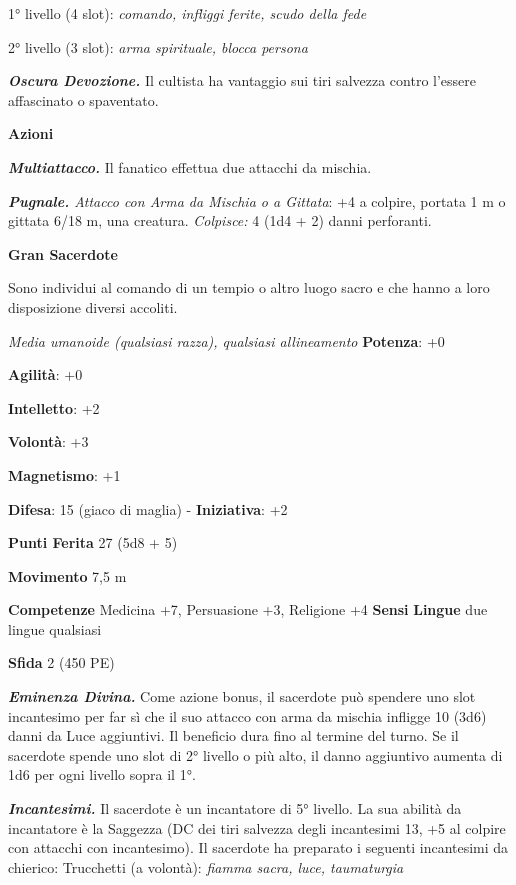 \begin{multicols}{2}
1° livello (4 slot): \emph{comando, infliggi ferite, scudo della fede}

2° livello (3 slot): \emph{arma spirituale, blocca persona}

\emph{\textbf{Oscura Devozione.}} Il cultista ha vantaggio sui tiri
salvezza contro l'essere affascinato o spaventato.

\smallskip\textbf{Azioni}

\emph{\textbf{Multiattacco.}} Il fanatico effettua due attacchi da
mischia.

\emph{\textbf{Pugnale.} Attacco con Arma da Mischia o a Gittata}: +4 a
colpire, portata 1 m o gittata 6/18 m, una creatura. \emph{Colpisce:}
4 (1d4 + 2) danni perforanti.

\textbf{Gran Sacerdote}

Sono individui al comando di un tempio o altro luogo sacro e che hanno a
loro disposizione diversi accoliti.

\emph{Media umanoide (qualsiasi razza), qualsiasi allineamento}
\textbf{Potenza}: +0

\textbf{Agilità}: +0

\textbf{Intelletto}: +2

\textbf{Volontà}: +3

\textbf{Magnetismo}: +1

\textbf{Difesa}: 15 (giaco di maglia) - \textbf{Iniziativa}: +2

\textbf{Punti Ferita} 27 (5d8 + 5)

\textbf{Movimento} 7,5 m

\textbf{Competenze} Medicina +7, Persuasione +3, Religione +4
\textbf{Sensi}  \textbf{Lingue} due lingue
qualsiasi

\textbf{Sfida} 2 (450 PE)\smallskip

\emph{\textbf{Eminenza Divina.}} Come azione bonus, il sacerdote può
spendere uno slot incantesimo per far sì che il suo attacco con arma da
mischia infligge 10 (3d6) danni da Luce aggiuntivi. Il beneficio dura
fino al termine del turno. Se il sacerdote spende uno slot di 2° livello
o più alto, il danno aggiuntivo aumenta di 1d6 per ogni livello sopra il
1°.

\emph{\textbf{Incantesimi.}} Il sacerdote è un incantatore di 5°
livello. La sua abilità da incantatore è la Saggezza (DC dei tiri
salvezza degli incantesimi 13, +5 al colpire con attacchi con
incantesimo). Il sacerdote ha preparato i seguenti incantesimi da
chierico: Trucchetti (a volontà): \emph{fiamma sacra, luce, taumaturgia}


\end{multicols}
